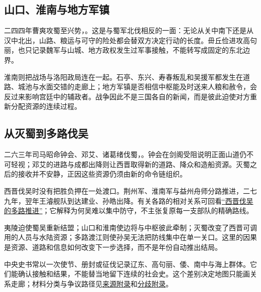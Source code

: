 \subsection{山口、淮南与地方军镇}

二四四年曹爽攻蜀至兴势，。这是与蜀军北伐相反的一面：无论从关中南下还是从汉中北出，山路、粮运与可守的险处都会替双方决定行动的长度。毌丘俭进攻高句丽，也只记录魏军与山城、地方政权发生过军事接触，不能转写成固定的东北边界。

淮南则把战场与洛阳政局连在一起。石亭、东兴、寿春叛乱和吴援军都发生在道路、城池与水面交错的走廊上；地方军镇是否相信中枢能及时送来人粮和赦令，会反过来影响宫廷中的辅政者。战争因此不是三国各自的新闻，而是彼此迫使对方重新分配资源的连续过程。

\subsection{从灭蜀到多路伐吴}

二六三年司马昭命钟会、邓艾、诸葛绪伐蜀，。钟会在剑阁受阻说明正面山道仍不可轻视；邓艾的进路与成都出降则让西晋取得新的道路、降众和造船资源。灭蜀之后的接收并不安静，正因这些资源仍须由新的命令链组织。

西晋伐吴时没有把胜负押在一处渡口。荆州军、淮南军与益州舟师分路推进，二七九年，翌年王濬舰队到达建业、孙皓出降。有关各路的相对关系可回看\hyperref[fig:vol02b:jin-conquest-wu]{“西晋伐吴的多路推进”}；它解释为何吴难以集中防守，不主张复原每一支部队的精确路线。

\begin{causalchain}[走廊怎样改变政治]
夷陵迫使蜀吴重新结盟；山口和淮南使边将与中枢彼此牵制；灭蜀改变了西晋可调用的人员与水陆资源；多路渡江则使孙吴无法把防线集中在单一关口。这里的因果是资源、道路和信息如何改变下一步选择，而不是年份自动推出结局。
\end{causalchain}

\begin{sourcenote}[边缘并非中枢的空白]
中央史书常以一次使节、册封或征伐记录辽东、高句丽、倭、南中与海上群体。它们能确认接触和结果，不能替当地留下连续的社会史。这个差别决定地图只能画关系走廊；材料分类与争议路径见\hyperref[app:sources]{来源附录}和\hyperref[app:debates]{分歧附录}。
\end{sourcenote}

